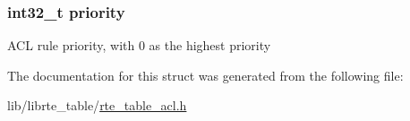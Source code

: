 \subsubsection[{priority}]{\setlength{\rightskip}{0pt plus 5cm}int32\+\_\+t priority}\label{structrte__table__acl__rule__add__params_a41b7c4ba47c44a632d5903b1f1338ad0}
A\+C\+L rule priority, with 0 as the highest priority 

The documentation for this struct was generated from the following file\+:\begin{DoxyCompactItemize}
\item 
lib/librte\+\_\+table/\hyperlink{rte__table__acl_8h}{rte\+\_\+table\+\_\+acl.\+h}\end{DoxyCompactItemize}
